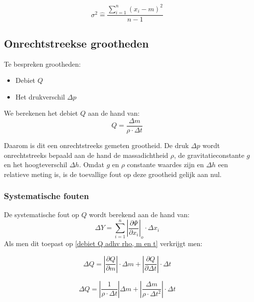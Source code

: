 \begin{equation}
    \sigma^{2} \hat{=} \frac{\sum\limits_{i=1}^n (x_i - m)^2}{n - 1}
\end{equation}


\subsection{Onrechtstreekse grootheden}

Te bespreken grootheden:
\begin{itemize}
    \item Debiet $Q$
    \item Het drukverschil $\Delta p$
\end{itemize}

We berekenen het debiet $Q$ aan de hand van: 
\begin{equation}
\label{debiet Q adhv rho, m en t}
    Q = \frac{\Delta m}{\rho \cdot \Delta t}
\end{equation}

Daarom is dit een onrechtstreeks gemeten grootheid.
De druk $\Delta p$ wordt onrechtstreeks bepaald aan de hand de massadichtheid $\rho$, de gravitatieconstante $g$ en het hoogteverschil $\Delta h$. Omdat $g$ en $\rho$ constante waardes zijn en $\Delta h$ een relatieve meting is, is de toevallige fout op deze grootheid gelijk aan nul.


\subsubsection{Systematische fouten}
De systematische fout op $Q$ wordt berekend aan de hand van:
\begin{equation}
    \Delta Y = \sum\limits_{i=1}^n \left|\frac{\partial \Psi}{\partial x_i}\right|_o \cdot \Delta x_i 
\end{equation}
Als men dit toepast op \eqref{debiet Q adhv rho, m en t} verkrijgt men:

\begin{equation}
    \Delta Q = \left|\frac{\partial Q}{\partial m}\right|\cdot \Delta m + \left| \frac{\partial Q}{\partial \Delta t}\right| \cdot \Delta t
\end{equation}

\begin{equation}
    \Delta Q = \left|\frac{1}{\rho \cdot \Delta t}\right|\Delta m + \left|\frac{\Delta m}{\rho \cdot \Delta t^{2}}\right|\cdot \Delta t
\end{equation}



